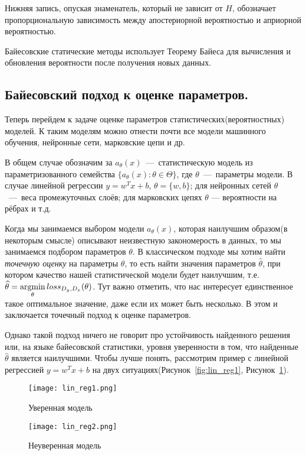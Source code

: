 Нижняя запись, опуская знаменатель, который не зависит от $H$, обозначает пропорциональную зависимость между апостериорной вероятностью и априорной вероятностью.

Байесовские статические методы использует Теорему Байеса для вычисления и обновления вероятности после получения новых данных.

\subsection{Байесовский подход к оценке параметров.}

Теперь перейдем к задаче оценке параметров статистических(вероятностных) моделей. К таким моделям можно отнести почти все модели машинного обучения, нейронные сети, марковские цепи и др.

В общем случае обозначим за $a_{\theta}(x)$~---~статистическую модель из параметризованного семейства $\{a_{\theta}(x) : \theta \in \Theta\}$, где $\theta$~---~параметры модели. В случае
 линейной регрессии $y = w^T x + b$, $\theta = \{w, b\}$; для нейронных сетей $\theta$~---~веса промежуточных слоёв; для марковских цепях $\theta$ --- вероятности на рёбрах и т.д.

Когда мы занимаемся выбором модели $a_{\theta}(x)$, которая наилучшим образом(в некоторым смысле) описывают неизвестную закономерость в данных, то мы занимаемся подбором параметров $\theta$.
 В классическом подходе мы хотим найти \textit{точечную оценку} на параметры $\theta$, то есть найти значения параметров $\widehat{\theta}$, при котором качество нашей статистической модели будет наилучшим,
 т.е. $\widehat{\theta} = \displaystyle \operatorname*{argmin}_{\theta} loss_{D_y, D_x}(\theta)$.
 Тут важно отметить, что нас интересует единственное такое оптимальное значение, даже если их может быть несколько. В этом и заключается точечный подход к оценке параметров.

Однако такой подход ничего не говорит про устойчивость найденного решения или, на языке байесовской статистики, уровня уверенности в том, что найденные $\widehat{\theta}$ является наилучшими.
 Чтобы лучше понять, рассмотрим пример с линейной регрессией $y = w^T x + b$ на двух ситуациях(Рисунок~\ref{fig:lin_reg1}, Рисунок~\ref{fig:lin_reg2}).

\begin{figure}[H]
    \begin{minipage}{0.48\textwidth}
        \centering
        \texttt{[image: lin\_reg1.png]}
        \caption{Уверенная модель}
        \label{fig:lin_reg1}
    \end{minipage}
    \hfill
    \begin{minipage}{0.48\textwidth}
        \centering
        \texttt{[image: lin\_reg2.png]}
        \caption{Неуверенная модель}
        \label{fig:lin_reg2}
    \end{minipage}
\end{figure}

